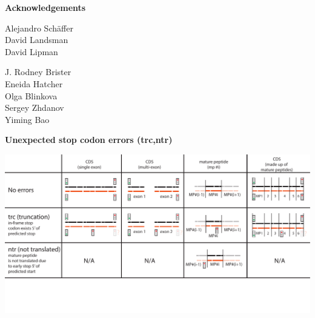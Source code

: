 \documentclass[landscape]{slides}
\begin{document}
\begin{slide}

\large
\begin{center}
\large{\textbf{Acknowledgements}} \\

\vspace{0.5in}

Alejandro Sch\"{a}ffer \\
David Landsman \\
David Lipman

\vspace{0.5in}

J. Rodney Brister \\
Eneida Hatcher \\
Olga Blinkova \\
Sergey Zhdanov \\ 
Yiming Bao \\

\end{center}

\vfill
\end{slide}
\begin{slide}
\begin{center}
\textbf{Unexpected stop codon errors (trc,ntr)}
\vspace{0.5in}

\includegraphics[width=10in]{figs/error-1-trc-ntr}
\end{center}
\vfill
\end{slide}
\end{document}
